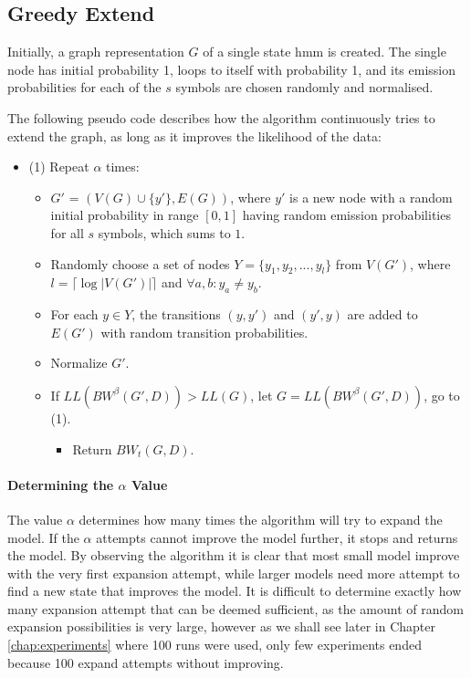 \subsection{Greedy Extend}
Initially, a graph representation $G$ of a single state \gls{hmm} is created. The single node has initial probability 1, loops to itself with probability 1, and its emission probabilities for each of the $s$ symbols are chosen randomly and normalised.

The following pseudo code describes how the algorithm continuously tries to extend the graph, as long as it improves the likelihood of the data:

\begin{itemize}
\item (1) Repeat $\alpha$ times:
	\begin{itemize}
	\item $G'$ = $(V(G) \cup \{y'\}, E(G))$, where $y'$ is a new node with a random initial probability in range $[0, 1]$ having random emission probabilities for all $s$ symbols, which sums to $1$.
	\item Randomly choose a set of nodes $Y = \{y_1, y_2, ... , y_l\}$ from $V(G')$, where $l = \lceil \log |V(G')| \rceil$ and $\forall a,b: y_a \neq y_b$.
	\item For each $y \in Y$, the transitions $(y, y')$ and $(y', y)$ are added to $E(G')$ with random transition probabilities.
	\item Normalize $G'$.
	\item If $LL(BW^{\beta}(G', D)) > LL(G)$, let $G = LL(BW^{\beta}(G', D))$, go to (1).
	\begin{itemize}
		\item Return $BW_t(G, D)$.
	\end{itemize}
	\end{itemize}
\end{itemize}

\paragraph{Determining the $\alpha$ Value}

The value $\alpha$ determines how many times the algorithm will try to expand the model. If the $\alpha$ attempts cannot improve the model further, it stops and returns the model. By observing the algorithm it is clear that most small model improve with the very first expansion attempt, while larger models need more attempt to find a new state that improves the model. It is difficult to determine exactly how many expansion attempt that can be deemed sufficient, as the amount of random expansion possibilities is very large, however as we shall see later in Chapter \ref{chap:experiments} where 100 runs were used, only few experiments ended because 100 expand attempts without improving.

